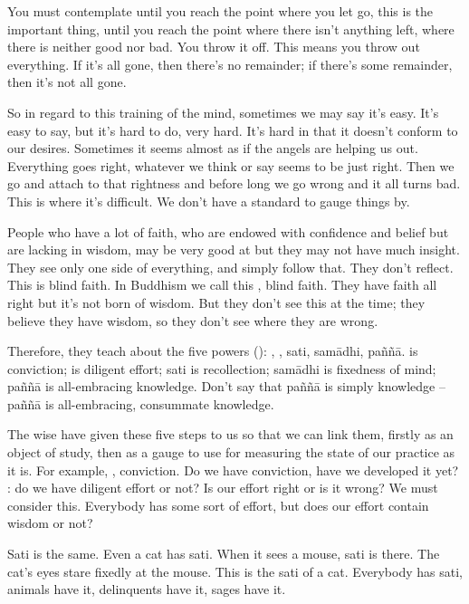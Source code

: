 You must contemplate until you reach the point where you let go, this is the important thing, until you reach the point where there isn't anything left, where there is neither good nor bad. You throw it off. This means you throw out everything. If it's all gone, then there's no remainder; if there's some remainder, then it's not all gone.

So in regard to this training of the mind, sometimes we may say it's easy. It's easy to say, but it's hard to do, very hard. It's hard in that it doesn't conform to our desires. Sometimes it seems almost as if the angels are helping us out. Everything goes right, whatever we think or say seems to be just right. Then we go and attach to that rightness and before long we go wrong and it all turns bad. This is where it's difficult. We don't have a standard to gauge things by.

People who have a lot of faith, who are endowed with confidence and belief but are lacking in wisdom, may be very good at  but they may not have much insight. They see only one side of everything, and simply follow that. They don't reflect. This is blind faith. In Buddhism we call this , blind faith. They have faith all right but it's not born of wisdom. But they don't see this at the time; they believe they have wisdom, so they don't see where they are wrong.

Therefore, they teach about the five powers (): , , sati, sam\=adhi, pa\~n\~n\=a.  is conviction;  is diligent effort; sati is recollection; sam\=adhi is fixedness of mind; pa\~n\~n\=a is all-embracing knowledge. Don't say that pa\~n\~n\=a is simply knowledge -- pa\~n\~n\=a is all-embracing, consummate knowledge.

The wise have given these five steps to us so that we can link them, firstly as an object of study, then as a gauge to use for measuring the state of our practice as it is. For example, , conviction. Do we have conviction, have we developed it yet? : do we have diligent effort or not? Is our effort right or is it wrong? We must consider this. Everybody has some sort of effort, but does our effort contain wisdom or not?

Sati is the same. Even a cat has sati. When it sees a mouse, sati is there. The cat's eyes stare fixedly at the mouse. This is the sati of a cat. Everybody has sati, animals have it, delinquents have it, sages have it.

